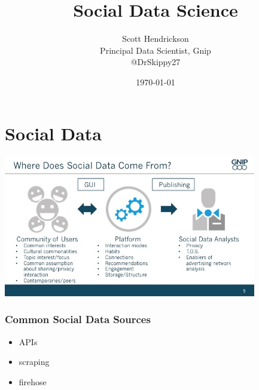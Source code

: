 \documentclass{beamer}
\begin{document}
\title{Social Data Science}
\author{Scott Hendrickson \\ Principal Data Scientist, Gnip \\  @DrSkippy27}
\date{\today} 


\begin{frame}
\titlepage
\end{frame}

\section{Social Data}
{
\begin{frame}
\textcolor{black} {
\hfill \Huge \insertsection}
\end{frame}
}


\begin{frame}
  \begin{center}
    \includegraphics[height=6.2cm]{./imgs/wheredoessocialdatacomefrom.jpg}
  \end{center}
\end{frame}

\begin{frame}\frametitle{Common Social Data Sources}
{\Huge
\begin{itemize}
\item APIs
\item scraping
\item firehose
\end{itemize}
}
\end{frame}
\end{document}
